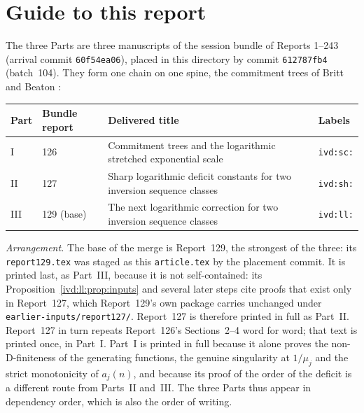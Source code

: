 \documentclass[11pt,letterpaper]{article}
\theoremstyle{remark}\newtheorem{remark}[theorem]{Remark}
\numberwithin{equation}{section}
\newcommand{\file}[1]{\nolinkurl{#1}}
\begin{document}
\section*{Guide to this report}\label{ivd:sec:guide}
The three Parts are three manuscripts of the session bundle of Reports 1--243 (arrival commit \texttt{60f54ea06}), placed in this directory by commit \texttt{612787fb4} (batch~104). They form one chain on one spine, the commitment trees of Britt and Beaton \cite{BB}:
\begin{center}
\small
\begin{tabular}{@{}l l >{\raggedright\arraybackslash}p{} l@{}}
\toprule
Part & Bundle report & Delivered title & Labels\\
\midrule
I & 126 & Commitment trees and the logarithmic stretched exponential scale & \texttt{ivd:sc:}\\
II & 127 & Sharp logarithmic deficit constants for two inversion sequence classes & \texttt{ivd:sh:}\\
III & 129 (base) & The next logarithmic correction for two inversion sequence classes & \texttt{ivd:ll:}\\
\bottomrule
\end{tabular}
\end{center}
\emph{Arrangement.} The base of the merge is Report~129, the strongest of the three: its \file{report129.tex} was staged as this \file{article.tex} by the placement commit. It is printed last, as Part~III, because it is not self-contained: its Proposition~\ref{ivd:ll:prop:inputs} and several later steps cite proofs that exist only in Report~127, which Report~129's own package carries unchanged under \file{earlier-inputs/report127/}. Report~127 is therefore printed in full as Part~II. Report~127 in turn repeats Report~126's Sections~2--4 word for word; that text is printed once, in Part~I. Part~I is printed in full because it alone proves the non-D-finiteness of the generating functions, the genuine singularity at $1/\mu_j$ and the strict monotonicity of $a_j(n)$, and because its proof of the order of the deficit is a different route from Parts~II and~III. The three Parts thus appear in dependency order, which is also the order of writing.
\end{document}
